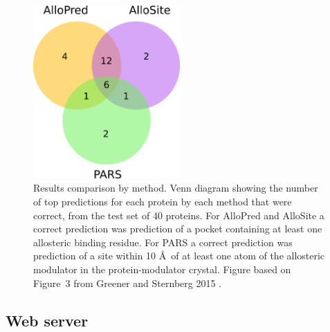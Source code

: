 \begin{figure}
\centering

\includegraphics[width=0.5\textwidth]{figures/results_venn/results_venn}

\caption{Results comparison by method.
Venn diagram showing the number of top predictions for each protein by each method that were correct, from the test set of 40 proteins.
For AlloPred and AlloSite a correct prediction was prediction of a pocket containing at least one allosteric binding residue.
For PARS a correct prediction was prediction of a site within 10 \AA\ of at least one atom of the allosteric modulator in the protein-modulator crystal.
Figure based on Figure~3 from Greener and Sternberg 2015 \cite{Greener2015}.}

\label{fig:results_venn}
\end{figure}


\subsection{Web server}

